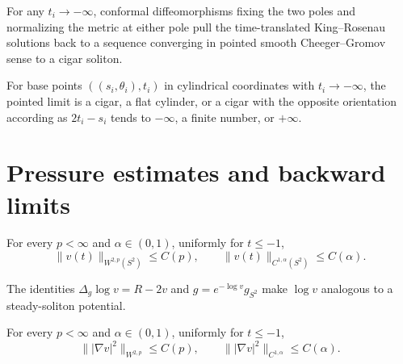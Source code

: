 \begin{lemma}
\label{lem:chow-iv-king-rosenau-pole-cigar-limit}
For any \(t_i\to-\infty\), conformal diffeomorphisms fixing the two poles and
normalizing the metric at either pole pull the time-translated King--Rosenau
solutions back to a sequence converging in pointed smooth Cheeger--Gromov
sense to a cigar soliton.
\end{lemma}

\begin{lemma}
\label{lem:chow-iv-king-rosenau-pointed-limits}
For base points \(((s_i,\theta_i),t_i)\) in cylindrical coordinates with
\(t_i\to-\infty\), the pointed limit is a cigar, a flat cylinder, or a cigar
with the opposite orientation according as \(2t_i-s_i\) tends to
\(-\infty\), a finite number, or \(+\infty\).
\end{lemma}

\section{Pressure estimates and backward limits}

\begin{lemma}
\label{lem:chow-iv-pressure-sobolev-holder}
For every \(p<\infty\) and \(\alpha\in(0,1)\), uniformly for \(t\le-1\),
\[
 \|v(t)\|_{W^{2,p}(S^2)}\le C(p),\qquad
 \|v(t)\|_{C^{1,\alpha}(S^2)}\le C(\alpha).
\]
\end{lemma}

\begin{remark}
\label{rem:chow-iv-pressure-soliton-potential}
The identities \(\Delta_g\log v=R-2v\) and
\(g=e^{-\log v}g_{S^2}\) make \(\log v\) analogous to a steady-soliton
potential.
\end{remark}

\begin{lemma}
\label{lem:chow-iv-pressure-gradient-regularity}
For every \(p<\infty\) and \(\alpha\in(0,1)\), uniformly for \(t\le-1\),
\[
 \bigl\||\nabla v|^2\bigr\|_{W^{2,p}}\le C(p),\qquad
 \bigl\||\nabla v|^2\bigr\|_{C^{1,\alpha}}\le C(\alpha).
\]
\end{lemma}

